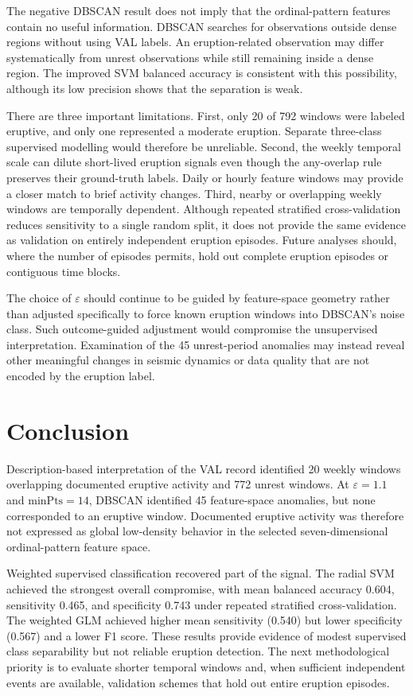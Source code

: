 \documentclass[11pt]{article}
\begin{document}
The negative DBSCAN result does not imply that the ordinal-pattern features contain no useful information. DBSCAN searches for observations outside dense regions without using VAL labels. An eruption-related observation may differ systematically from unrest observations while still remaining inside a dense region. The improved SVM balanced accuracy is consistent with this possibility, although its low precision shows that the separation is weak.

There are three important limitations. First, only 20 of 792 windows were labeled eruptive, and only one represented a moderate eruption. Separate three-class supervised modelling would therefore be unreliable. Second, the weekly temporal scale can dilute short-lived eruption signals even though the any-overlap rule preserves their ground-truth labels. Daily or hourly feature windows may provide a closer match to brief activity changes. Third, nearby or overlapping weekly windows are temporally dependent. Although repeated stratified cross-validation reduces sensitivity to a single random split, it does not provide the same evidence as validation on entirely independent eruption episodes. Future analyses should, where the number of episodes permits, hold out complete eruption episodes or contiguous time blocks.

The choice of $\varepsilon$ should continue to be guided by feature-space geometry rather than adjusted specifically to force known eruption windows into DBSCAN's noise class. Such outcome-guided adjustment would compromise the unsupervised interpretation. Examination of the 45 unrest-period anomalies may instead reveal other meaningful changes in seismic dynamics or data quality that are not encoded by the eruption label.

\section{Conclusion}

Description-based interpretation of the VAL record identified 20 weekly windows overlapping documented eruptive activity and 772 unrest windows. At $\varepsilon=1.1$ and $\mathrm{minPts}=14$, DBSCAN identified 45 feature-space anomalies, but none corresponded to an eruptive window. Documented eruptive activity was therefore not expressed as global low-density behavior in the selected seven-dimensional ordinal-pattern feature space.

Weighted supervised classification recovered part of the signal. The radial SVM achieved the strongest overall compromise, with mean balanced accuracy 0.604, sensitivity 0.465, and specificity 0.743 under repeated stratified cross-validation. The weighted GLM achieved higher mean sensitivity (0.540) but lower specificity (0.567) and a lower F1 score. These results provide evidence of modest supervised class separability but not reliable eruption
detection. The next methodological priority is to evaluate shorter temporal windows and, when sufficient independent events are available, validation schemes that hold out entire eruption episodes.	

	
\end{document}
